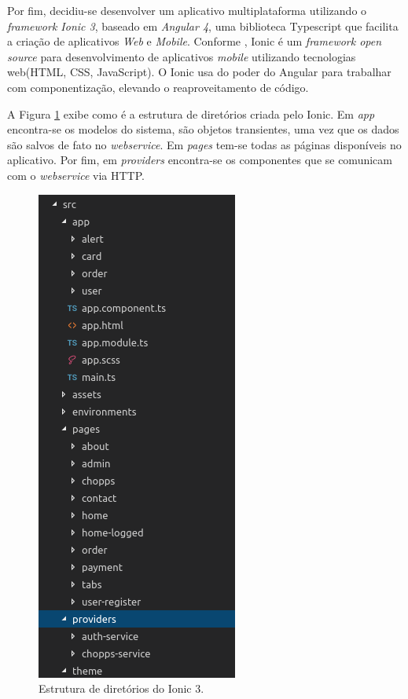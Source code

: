 Por fim, decidiu-se desenvolver um aplicativo multiplataforma utilizando o \textit{framework Ionic 3}, baseado em \textit{Angular 4}, uma biblioteca Typescript que facilita a criação de aplicativos \textit{Web} e \textit{Mobile}. Conforme \cite{ionic}, Ionic é um \textit{framework open source} para desenvolvimento de aplicativos \textit{mobile} utilizando tecnologias web(HTML, CSS, JavaScript). O Ionic usa do poder do Angular para trabalhar com componentização, elevando o reaproveitamento de código.

A Figura \ref{ionicdir} exibe como é a estrutura de diretórios criada pelo Ionic. Em \textit{app} encontra-se os modelos do sistema, são objetos transientes, uma vez que os dados são salvos de fato no \textit{webservice}. Em \textit{pages} tem-se todas as páginas disponíveis no aplicativo. Por fim, em \textit{providers} encontra-se os componentes que se comunicam com o \textit{webservice} via HTTP.

\begin{figure}[!hb]
    \centering
    \includegraphics{figuras/ionicstructure.png}
    \caption{Estrutura de diretórios do Ionic 3.}
    \label{ionicdir}
\end{figure}

